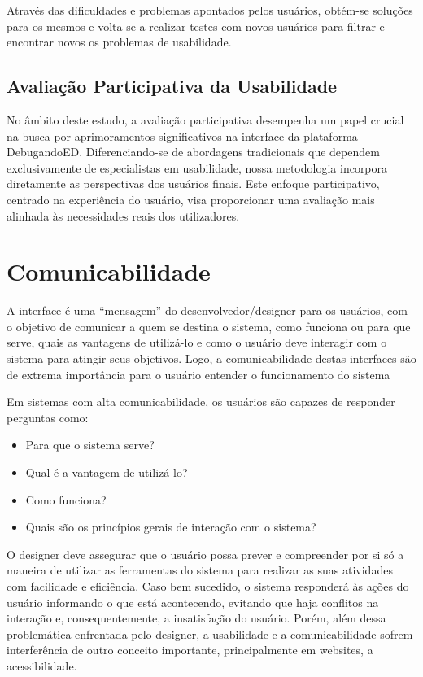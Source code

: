 Através das dificuldades e problemas apontados pelos usuários, obtém-se soluções para os mesmos e volta-se a realizar testes com novos usuários para filtrar e encontrar novos os problemas de usabilidade.

\subsection{Avaliação Participativa da Usabilidade}
\label{Avaliação_Participativa_da_Usabilidade}

No âmbito deste estudo, a avaliação participativa desempenha um papel crucial na busca por aprimoramentos significativos na interface da plataforma DebugandoED. Diferenciando-se de abordagens tradicionais que dependem exclusivamente de especialistas em usabilidade, nossa metodologia incorpora diretamente as perspectivas dos usuários finais. Este enfoque participativo, centrado na experiência do usuário, visa proporcionar uma avaliação mais alinhada às necessidades reais dos utilizadores.

\section{Comunicabilidade}
\label{Comunicabilidade}
A interface é uma “mensagem” do desenvolvedor/designer para os usuários, com o objetivo de comunicar a quem se destina o sistema, como funciona ou para que serve, quais as vantagens de utilizá-lo e como o usuário deve interagir com o sistema para atingir seus objetivos. Logo, a comunicabilidade destas interfaces são de extrema importância para o usuário entender o funcionamento do sistema \cite{normanDAODESIGNDODIA}

Em sistemas com alta comunicabilidade, os usuários são capazes de responder perguntas como:
\begin{itemize}
    \item Para que o sistema serve?
    \item Qual é a vantagem de utilizá-lo?
    \item Como funciona?
    \item Quais são os princípios gerais de interação com o sistema?
\end{itemize}

O designer deve assegurar que o usuário possa prever e compreender por si só a maneira de utilizar as ferramentas do sistema para realizar as suas atividades com facilidade e eficiência. Caso bem sucedido, o sistema responderá às ações do usuário informando o que está acontecendo, evitando que haja conflitos na interação e, consequentemente, a insatisfação do usuário. Porém, além dessa problemática enfrentada pelo designer, a usabilidade e a comunicabilidade sofrem interferência de outro conceito importante, principalmente em websites, a acessibilidade. 

